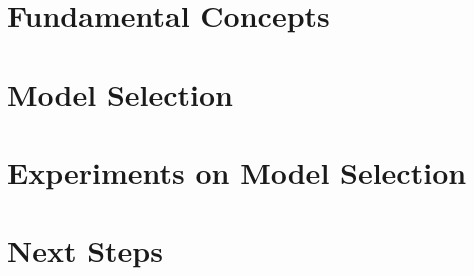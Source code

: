 \documentclass{beamer}
\begin{document}
\section{Fundamental Concepts}

\section{Model Selection}


\section{Experiments on Model Selection}
\begin{frame}
\end{frame}
\section{Next Steps}
\end{document}
